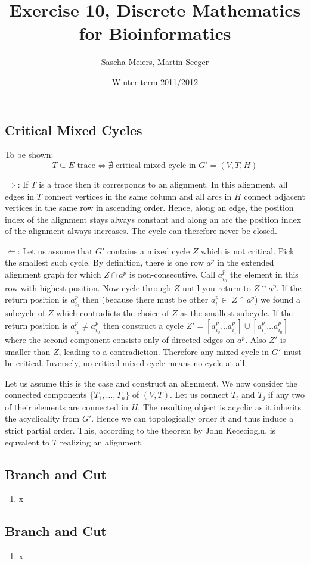 \documentclass[a4paper, oneside]{scrartcl}
\author{Sascha Meiers, Martin Seeger}
\title{Exercise 10, Discrete Mathematics for Bioinformatics}
\date{Winter term 2011/2012}
\begin{document}
\maketitle


\subsection{Critical Mixed Cycles}

To be shown:
\[
T \subseteq E \textrm{ trace} \Longleftrightarrow \nexists \textrm{ critical
mixed cycle in } G' = (V, T, H)
\]

$\Rightarrow$: If $T$ is a trace then it corresponds to an alignment. In this
alignment, all edges in $T$ connect vertices in the same column and all arcs in
$H$ connect adjacent vertices in the same row in ascending order. Hence, along
an edge, the position index of the alignment stays always constant and along an
arc the position index of the alignment always increases. The cycle can
therefore never be closed.

$\Leftarrow$: Let us assume that $G'$ contains a mixed cycle $Z$ which is not
critical. Pick the smallest such cycle. By definition, there is one row $a^p$ in
the extended alignment graph for which $Z \cap a^p$ is non-consecutive. Call
$a^p_{i_0}$ the element in this row with highest position. Now cycle through $Z$
until you return to $Z \cap a^p$. 
If the return position is $a^p_{i_0}$ then
(because there must be other $a^p_i \in $ $Z \cap a^p$) we found a subcycle of $Z$ which
contradicts the choice of $Z$ as the smallest subcycle.
If the return position is $a^p_{i_1} \neq a^p_{i_0}$ then construct a cycle $Z' =
[a^p_{i_0} \ldots a^p_{i_1}] \cup [a^p_{i_1} \ldots a^p_{i_0}]$ where the second
component consists only of directed edges on $a^p$. Also $Z'$ is smaller than
$Z$, leading to a contradiction.
Therefore any mixed cycle in $G'$ must be critical. Inversely, no critical mixed
cycle means no cycle at all. 

Let us assume this is the case and construct an
alignment. We now consider the connected components $\{T_1,\ldots,T_n\}$ of
$(V, T)$. Let us connect $T_i$ and $T_j$ if any two of their elements are
connected in $H$. The resulting object is acyclic as it inherits the
acyclicality from $G'$. Hence we can topologically order it and thus induce a
strict partial order. This, according to the theorem by John Kececioglu, is
equvalent to $T$ realizing an alignment.$\square$

\subsection{Branch and Cut}

\renewcommand{\labelenumi}{\alph{enumi})}
\begin{enumerate}
  \item 
x
\end{enumerate}

\subsection{Branch and Cut}

\renewcommand{\labelenumi}{\alph{enumi})}
\begin{enumerate}
  \item 
x
\end{enumerate}
\end{document}
